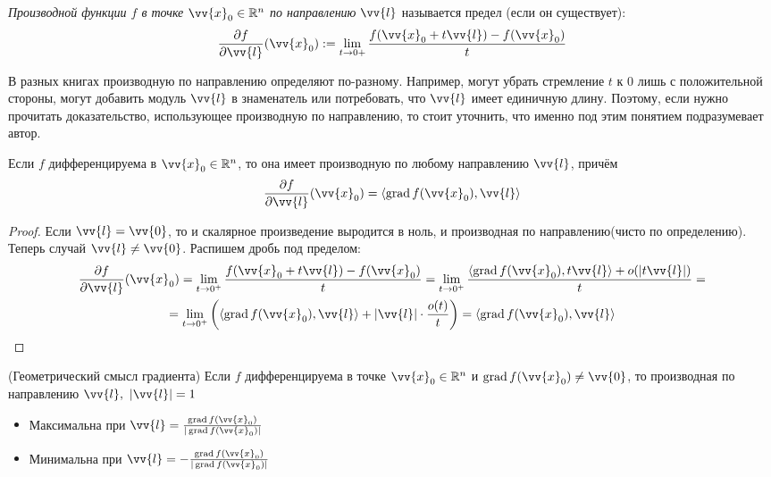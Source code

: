 \begin{definition}
	\textit{Производной функции $f$ в точке $\vv{x}_0 \in \R^n$ по направлению} $\vv{l}$ называется предел (если он существует):
	\[
		\pd{f}{\vv{l}} (\vv{x}_0) := \liml_{t \to 0+} \frac{f(\vv{x}_0 + t\vv{l}) - f(\vv{x}_0)}{t}
	\]
\end{definition}

\begin{note}
	В разных книгах производную по направлению определяют по-разному. Например, могут убрать стремление $t$ к 0 лишь с положительной стороны, могут добавить модуль $\vv{l}$ в знаменатель или потребовать, что $\vv{l}$ имеет единичную длину. Поэтому, если нужно прочитать доказательство, использующее производную по направлению, то стоит уточнить, что именно под этим понятием подразумевает автор.
\end{note}

\begin{theorem}
	Если $f$ дифференцируема в $\vv{x}_0\in \R^n$, то она имеет производную по любому направлению $\vv{l}$, причём
	\[
		\pd{f}{\vv{l}} (\vv{x}_0) = \trbr{\grad f(\vv{x}_0), \vv{l}}
	\]
\end{theorem}

\begin{proof}
	Если $\vv{l} = \vv{0}$, то и скалярное произведение выродится в ноль, и производная по направлению(чисто по определению). Теперь случай $\vv{l} \neq \vv{0}$. Распишем дробь под пределом:
	\begin{multline*}
		\pd{f}{\vv{l}}(\vv{x}_0) = \liml_{t \to 0^+}\frac{f(\vv{x}_0 + t\vv{l}) - f(\vv{x}_0)}{t} = \liml_{t \to 0^+}\frac{\trbr{\grad f(\vv{x}_0), t\vv{l}} + o(|t\vv{l}|)}{t} = \\
		= \liml_{t \to 0^+} \left(\trbr{\grad f(\vv{x}_0), \vv{l}} + |\vv{l}| \cdot \frac{o(t)}{t}\right) = \trbr{\grad f(\vv{x}_0), \vv{l}}
	\end{multline*}
\end{proof}

\begin{theorem}
	(Геометрический смысл градиента)
	Если $f$ дифференцируема в точке $\vv{x}_0\in\R^n$ и $\grad f(\vv{x}_0) \neq \vv{0}$, то производная по направлению $\vv{l},\ |\vv{l}| = 1$
	\begin{itemize}
		\item Максимальна при $\vv{l} = \frac{\grad f(\vv{x}_0)}{|\grad f(\vv{x}_0)|}$
		
		\item Минимальна при $\vv{l} = -\frac{\grad f(\vv{x}_0)}{|\grad f(\vv{x}_0)|}$
	\end{itemize}
\end{theorem}

